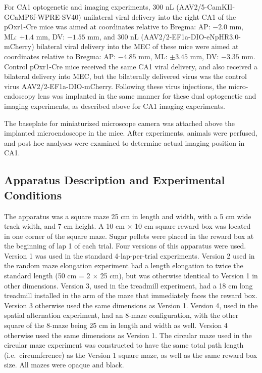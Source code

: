For CA1 optogenetic and imaging experiments, 300 nL (AAV2/5-CamKII-GCaMP6f-WPRE-SV40) unilateral viral delivery into the right CA1 of the pOxr1-Cre mice was aimed at coordinates relative to Bregma: AP: $-2.0$ mm, ML: $+1.4$ mm, DV: $-1.55$ mm, and 300 nL (AAV2/2-EF1a-DIO-eNpHR3.0-mCherry) bilateral viral delivery into the MEC of these mice were aimed at coordinates relative to Bregma: AP: $-4.85$ mm, ML: $\pm 3.45$ mm, DV: $-3.35$ mm. Control pOxr1-Cre mice received the same CA1 viral delivery, and also received a bilateral delivery into MEC, but the bilaterally delivered virus was the control virus AAV2/2-EF1a-DIO-mCherry. Following these virus injections, the micro-endoscopy lens was implanted in the same manner for these dual optogenetic and imaging experiments, as described above for CA1 imaging experiments.

The baseplate for miniaturized microscope camera was attached above the implanted microendoscope in the mice. After experiments, animals were perfused, and post hoc analyses were examined to determine actual imaging position in CA1.

\subsection{Apparatus Description and Experimental Conditions}

The apparatus was a square maze 25 cm in length and width, with a 5 cm wide track width, and 7 cm height. A 10 cm $\times$ 10 cm square reward box was located in one corner of the square maze. Sugar pellets were placed in the reward box at the beginning of lap 1 of each trial. Four versions of this apparatus were used. Version 1 was used in the standard 4-lap-per-trial experiments. Version 2 used in the random maze elongation experiment had a length elongation to twice the standard length (50 cm = 2 $\times$ 25 cm), but was otherwise identical to Version 1 in other dimensions. Version 3, used in the treadmill experiment, had a 18 cm long treadmill installed in the arm of the maze that immediately faces the reward box. Version 3 otherwise used the same dimensions as Version 1. Version 4, used in the spatial alternation experiment, had an 8-maze configuration, with the other square of the 8-maze being 25 cm in length and width as well. Version 4 otherwise used the same dimensions as Version 1. The circular maze used in the circular maze experiment was constructed to have the same total path length (i.e.\ circumference) as the Version 1 square maze, as well as the same reward box size. All mazes were opaque and black.


